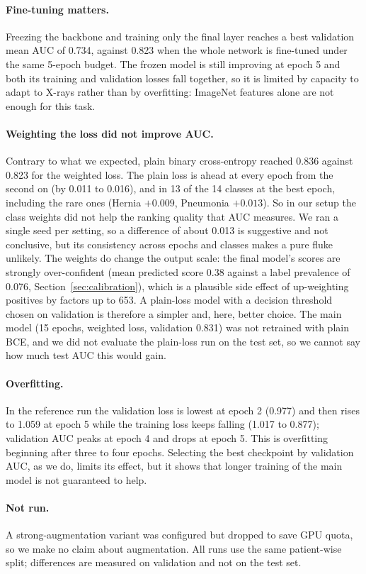 \paragraph{Fine-tuning matters.} Freezing the backbone and training only the final layer reaches a best validation mean AUC of 0.734, against 0.823 when the whole network is fine-tuned under the same 5-epoch budget. The frozen model is still improving at epoch 5 and both its training and validation losses fall together, so it is limited by capacity to adapt to X-rays rather than by overfitting: ImageNet features alone are not enough for this task.

\paragraph{Weighting the loss did not improve AUC.} Contrary to what we expected, plain binary cross-entropy reached 0.836 against 0.823 for the weighted loss. The plain loss is ahead at every epoch from the second on (by 0.011 to 0.016), and in 13 of the 14 classes at the best epoch, including the rare ones (Hernia $+0.009$, Pneumonia $+0.013$). So in our setup the class weights did not help the ranking quality that AUC measures. We ran a single seed per setting, so a difference of about 0.013 is suggestive and not conclusive, but its consistency across epochs and classes makes a pure fluke unlikely. The weights do change the output scale: the final model's scores are strongly over-confident (mean predicted score 0.38 against a label prevalence of 0.076, Section~\ref{sec:calibration}), which is a plausible side effect of up-weighting positives by factors up to 653. A plain-loss model with a decision threshold chosen on validation is therefore a simpler and, here, better choice. The main model (15 epochs, weighted loss, validation 0.831) was not retrained with plain BCE, and we did not evaluate the plain-loss run on the test set, so we cannot say how much test AUC this would gain.

\paragraph{Overfitting.} In the reference run the validation loss is lowest at epoch 2 (0.977) and then rises to 1.059 at epoch 5 while the training loss keeps falling (1.017 to 0.877); validation AUC peaks at epoch 4 and drops at epoch 5. This is overfitting beginning after three to four epochs. Selecting the best checkpoint by validation AUC, as we do, limits its effect, but it shows that longer training of the main model is not guaranteed to help.

\paragraph{Not run.} A strong-augmentation variant was configured but dropped to save GPU quota, so we make no claim about augmentation. All runs use the same patient-wise split; differences are measured on validation and not on the test set.
